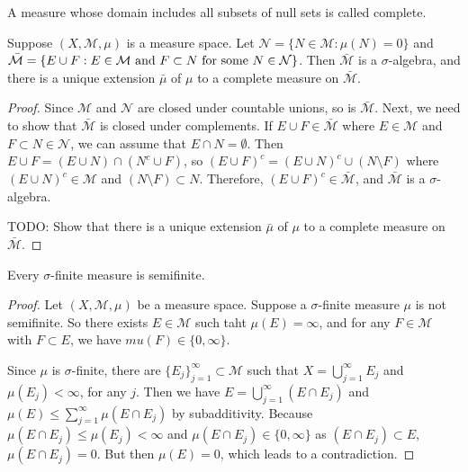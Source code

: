 \begin{definition}
    A measure whose domain includes all subsets of null sets is called complete.
\end{definition}

\begin{theorem}
    Suppose $(X, \mathcal{M}, \mu)$ is a measure space.
    Let $\mathcal{N} = \{ N \in \mathcal{M}: \mu(N) = 0 \}$ and $\Bar{\mathcal{M}} = \{ E \cup F: E \in \mathcal{M} \text{ and } F \subset N \text{ for some } N \in \mathcal{N} \}$.
    Then $\bar{\mathcal{M}}$ is a $\sigma$-algebra, and there is a unique extension $\bar{\mu}$ of $\mu$ to a complete measure on $\bar{\mathcal{M}}$.
\end{theorem}

\begin{proof}
    Since $\mathcal{M}$ and $\mathcal{N}$ are closed under countable unions, so is $\bar{\mathcal{M}}$.
    Next, we need to show that $\bar{\mathcal{M}}$ is closed under complements.
    If $E \cup F \in \bar{\mathcal{M}}$ where $E \in \mathcal{M}$ and $F \subset N \in \mathcal{N}$, we can assume that $E \cap N = \emptyset$.
    Then $E \cup F = (E \cup N) \cap (N^c \cup F)$, so $(E \cup F)^c = (E \cup N)^c \cup (N \setminus F)$ where $(E \cup N)^c \in \mathcal{M}$ and $(N \setminus F) \subset N$.
    Therefore, $(E \cup F)^c \in \bar{\mathcal{M}}$, and $\bar{\mathcal{M}}$ is a $\sigma$-algebra.

    TODO: Show that there is a unique extension $\bar{\mu}$ of $\mu$ to a complete measure on $\bar{\mathcal{M}}$.
\end{proof}

\begin{proposition}
    Every $\sigma$-finite measure is semifinite.
\end{proposition}

\begin{proof}
    Let $(X, \mathcal{M}, \mu)$ be a measure space.
    Suppose a $\sigma$-finite measure $\mu$ is not semifinite.
    So there exists $E \in \mathcal{M}$ such taht $\mu(E) = \infty$, and for any $F \in \mathcal{M}$ with $F \subset E$, we have $mu(F) \in \{ 0, \infty \}$.

    Since $\mu$ is $\sigma$-finite, there are $\{ E_j \}_{j=1}^{\infty} \subset \mathcal{M}$ such that $X = \bigcup_{j=1}^{\infty} E_j$ and $\mu(E_j) < \infty$, for any $j$.
    Then we have $E = \bigcup_{j=1}^{\infty} (E \cap E_j)$ and $\mu(E) \le \sum_{j=1}^{\infty} \mu(E \cap E_j)$ by subadditivity.
    Because $\mu(E \cap E_j) \le \mu(E_j) < \infty$ and $\mu(E \cap E_j) \in \{ 0, \infty \}$ as $(E \cap E_j) \subset E$, $\mu(E \cap E_j) = 0$.
    But then $\mu(E) = 0$, which leads to a contradiction.
\end{proof}

